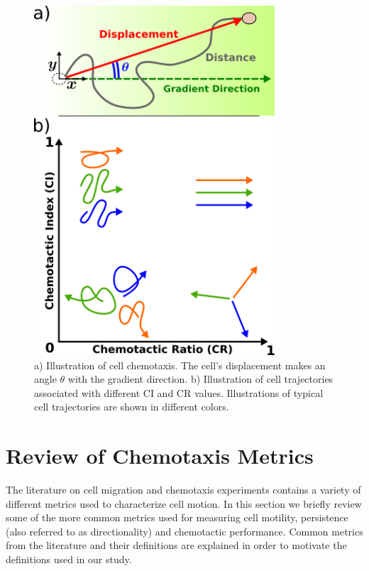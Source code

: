 \begin{figure}
    \centering
    \includegraphics[width=0.80\textwidth]{../fig/ch2_fig1.png}
    \caption{a) Illustration of cell chemotaxis. The cell's displacement makes an angle $\theta$ with the gradient direction. b) Illustration of cell trajectories associated with different CI and CR values. Illustrations of typical cell trajectories are shown in different colors.} \label{fig:ch2_1}
\end{figure}


\section{Review of Chemotaxis Metrics}

The literature on cell migration and chemotaxis experiments contains a variety of different metrics used to characterize cell motion. In this section we briefly review some of the more common metrics used for measuring cell motility, persistence (also referred to as directionality) and chemotactic performance. Common metrics from the literature and their definitions are explained in order to motivate the definitions used in our study.

